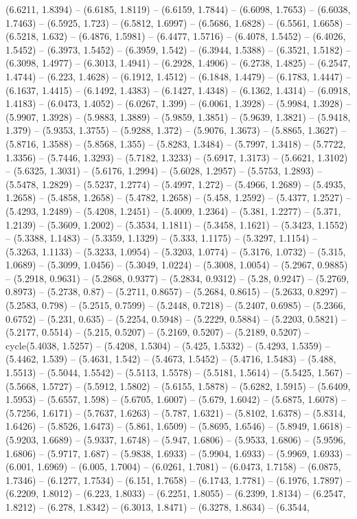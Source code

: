 (6.6211, 1.8394) -- (6.6185, 1.8119) -- (6.6159, 1.7844) -- (6.6098, 1.7653) -- (6.6038, 1.7463) -- (6.5925, 1.723) -- (6.5812, 1.6997) -- (6.5686, 1.6828) -- (6.5561, 1.6658) -- (6.5218, 1.632) -- (6.4876, 1.5981) -- (6.4477, 1.5716) -- (6.4078, 1.5452) -- (6.4026, 1.5452) -- (6.3973, 1.5452) -- (6.3959, 1.542) -- (6.3944, 1.5388) -- (6.3521, 1.5182) -- (6.3098, 1.4977) -- (6.3013, 1.4941) -- (6.2928, 1.4906) -- (6.2738, 1.4825) -- (6.2547, 1.4744) -- (6.223, 1.4628) -- (6.1912, 1.4512) -- (6.1848, 1.4479) -- (6.1783, 1.4447) -- (6.1637, 1.4415) -- (6.1492, 1.4383) -- (6.1427, 1.4348) -- (6.1362, 1.4314) -- (6.0918, 1.4183) -- (6.0473, 1.4052) -- (6.0267, 1.399) -- (6.0061, 1.3928) -- (5.9984, 1.3928) -- (5.9907, 1.3928) -- (5.9883, 1.3889) -- (5.9859, 1.3851) -- (5.9639, 1.3821) -- (5.9418, 1.379) -- (5.9353, 1.3755) -- (5.9288, 1.372) -- (5.9076, 1.3673) -- (5.8865, 1.3627) -- (5.8716, 1.3588) -- (5.8568, 1.355) -- (5.8283, 1.3484) -- (5.7997, 1.3418) -- (5.7722, 1.3356) -- (5.7446, 1.3293) -- (5.7182, 1.3233) -- (5.6917, 1.3173) -- (5.6621, 1.3102) -- (5.6325, 1.3031) -- (5.6176, 1.2994) -- (5.6028, 1.2957) -- (5.5753, 1.2893) -- (5.5478, 1.2829) -- (5.5237, 1.2774) -- (5.4997, 1.272) -- (5.4966, 1.2689) -- (5.4935, 1.2658) -- (5.4858, 1.2658) -- (5.4782, 1.2658) -- (5.458, 1.2592) -- (5.4377, 1.2527) -- (5.4293, 1.2489) -- (5.4208, 1.2451) -- (5.4009, 1.2364) -- (5.381, 1.2277) -- (5.371, 1.2139) -- (5.3609, 1.2002) -- (5.3534, 1.1811) -- (5.3458, 1.1621) -- (5.3423, 1.1552) -- (5.3388, 1.1483) -- (5.3359, 1.1329) -- (5.333, 1.1175) -- (5.3297, 1.1154) -- (5.3263, 1.1133) -- (5.3233, 1.0954) -- (5.3203, 1.0774) -- (5.3176, 1.0732) -- (5.315, 1.0689) -- (5.3099, 1.0456) -- (5.3049, 1.0224) -- (5.3008, 1.0054) -- (5.2967, 0.9885) -- (5.2918, 0.9631) -- (5.2868, 0.9377) -- (5.2834, 0.9312) -- (5.28, 0.9247) -- (5.2769, 0.8973) -- (5.2738, 0.87) -- (5.2711, 0.8657) -- (5.2684, 0.8615) -- (5.2633, 0.8297) -- (5.2583, 0.798) -- (5.2515, 0.7599) -- (5.2448, 0.7218) -- (5.2407, 0.6985) -- (5.2366, 0.6752) -- (5.231, 0.635) -- (5.2254, 0.5948) -- (5.2229, 0.5884) -- (5.2203, 0.5821) -- (5.2177, 0.5514) -- (5.215, 0.5207) -- (5.2169, 0.5207) -- (5.2189, 0.5207) -- cycle(5.4038, 1.5257) -- (5.4208, 1.5304) -- (5.425, 1.5332) -- (5.4293, 1.5359) -- (5.4462, 1.539) -- (5.4631, 1.542) -- (5.4673, 1.5452) -- (5.4716, 1.5483) -- (5.488, 1.5513) -- (5.5044, 1.5542) -- (5.5113, 1.5578) -- (5.5181, 1.5614) -- (5.5425, 1.567) -- (5.5668, 1.5727) -- (5.5912, 1.5802) -- (5.6155, 1.5878) -- (5.6282, 1.5915) -- (5.6409, 1.5953) -- (5.6557, 1.598) -- (5.6705, 1.6007) -- (5.679, 1.6042) -- (5.6875, 1.6078) -- (5.7256, 1.6171) -- (5.7637, 1.6263) -- (5.787, 1.6321) -- (5.8102, 1.6378) -- (5.8314, 1.6426) -- (5.8526, 1.6473) -- (5.861, 1.6509) -- (5.8695, 1.6546) -- (5.8949, 1.6618) -- (5.9203, 1.6689) -- (5.9337, 1.6748) -- (5.947, 1.6806) -- (5.9533, 1.6806) -- (5.9596, 1.6806) -- (5.9717, 1.687) -- (5.9838, 1.6933) -- (5.9904, 1.6933) -- (5.9969, 1.6933) -- (6.001, 1.6969) -- (6.005, 1.7004) -- (6.0261, 1.7081) -- (6.0473, 1.7158) -- (6.0875, 1.7346) -- (6.1277, 1.7534) -- (6.151, 1.7658) -- (6.1743, 1.7781) -- (6.1976, 1.7897) -- (6.2209, 1.8012) -- (6.223, 1.8033) -- (6.2251, 1.8055) -- (6.2399, 1.8134) -- (6.2547, 1.8212) -- (6.278, 1.8342) -- (6.3013, 1.8471) -- (6.3278, 1.8634) -- (6.3544, 